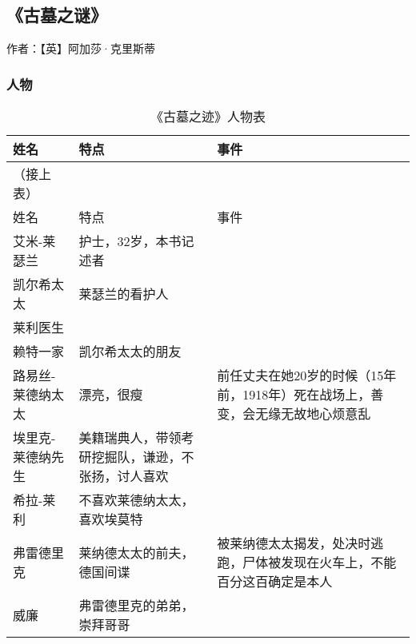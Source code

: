 \subsection{《古墓之谜》}

作者：【英】阿加莎·克里斯蒂

\subsubsection{人物}

\begin{longtable}{p{} | p{} | p{}}
        \caption{《古墓之迹》人物表} \\
        \hline
    姓名 & 特点 & 事件 \\
    \hline
    \endfirsthead
    
    （接上表） \\
    姓名 & 特点 & 事件 \\
    \hline
    \endhead
    
    \hline
    \endfoot
艾米-莱瑟兰 & 护士，32岁，本书记述者 & \\	
凯尔希太太 & 莱瑟兰的看护人	& \\
莱利医生 & & \\	
赖特一家 & 凯尔希太太的朋友	& \\
路易丝-莱德纳太太 & 漂亮，很瘦 & 前任丈夫在她20岁的时候（15年前，1918年）死在战场上，善变，会无缘无故地心烦意乱 \\
埃里克-莱德纳先生 & 美籍瑞典人，带领考研挖掘队，谦逊，不张扬，讨人喜欢	& \\
希拉-莱利 & 不喜欢莱德纳太太，喜欢埃莫特 & \\
弗雷德里克 & 莱纳德太太的前夫，德国间谍 & 被莱纳德太太揭发，处决时逃跑，尸体被发现在火车上，不能百分这百确定是本人 \\
威廉 & 弗雷德里克的弟弟，崇拜哥哥 & \\

\end{longtable}

